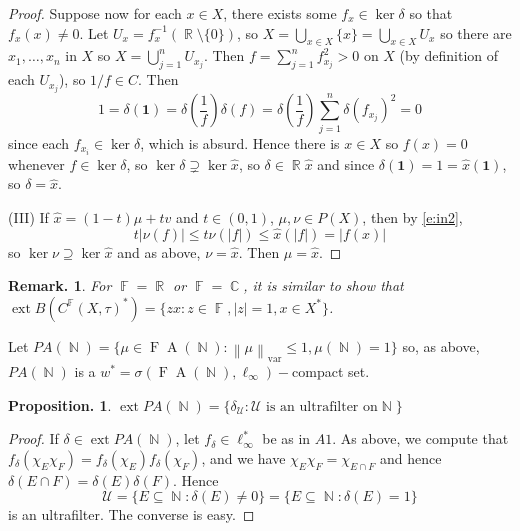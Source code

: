 \documentclass[11pt, a4paper]{memoir}
\DeclareMathOperator{\N}{{\mathbb{N}}}
\DeclareMathOperator{\R}{{\mathbb{R}}}
\DeclareMathOperator{\C}{{\mathbb{C}}}
\DeclareMathOperator{\F}{{\mathbb{F}}}
\newcommand{\norm}[1]{\ensuremath{\left\lVert#1\right\rVert}}
\theoremstyle{change}
\newtheorem{proposition}[theorem]{Proposition.}
\theoremstyle{plain}
\theoremstyle{nonumberplain}
\newtheorem{remark}{Remark.}
\newtheorem{proof}{Proof}
\DeclareMathOperator{\ext}{ext}
\newcommand{\idc}{\mathbf{1}}
\newcommand{\FA}{\ensuremath{\operatorname{F}\!\operatorname{A}}}
\numberwithin{equation}{section}
\begin{document}
\begin{proof}
    Suppose now for each $x\in X$, there exists some $f_x\in\ker\delta$ so that $f_x(x)\neq 0$.
    Let $U_x=f_x^{-1}(\R\setminus\{0\})$, so $X=\bigcup_{x\in X}\{x\}=\bigcup_{x\in X}U_x$ so there are $x_1,\ldots,x_n$ in $X$ so $X=\bigcup_{j=1}^n U_{x_j}$.
    Then $f=\sum_{j=1}^n f_{x_j}^2>0$ on $X$ (by definition of each $U_{x_j}$), so $1/f\in C$.
    Then
    \begin{equation*}
        1 = \delta(\idc)=\delta\left(\frac{1}{f}\right)\delta(f)=\delta\left(\frac{1}{f}\right)\sum_{j=1}^n\delta(f_{x_j})^2=0
    \end{equation*}
    since each $f_{x_i}\in\ker\delta$, which is absurd.
    Hence there is $x\in X$ so $f(x)=0$ whenever $f\in\ker\delta$, so $\ker\delta\supsetneq\ker\hat x$, so $\delta\in\R\hat x$ and since $\delta(\idc)=1=\hat x(\idc)$, so $\delta=\hat x$.

    (III) If $\hat x=(1-t)\mu+tv$ and $t\in(0,1)$, $\mu,\nu\in P(X)$, then by \cref{e:in2},
    \begin{equation*}
        t|\nu(f)|\leq t\nu(|f|)\leq\hat x(|f|)=|f(x)|
    \end{equation*}
    so $\ker\nu\supseteq\ker\hat x$ and as above, $\nu=\hat x$.
    Then $\mu=\hat x$.
\end{proof}
\begin{remark}
    For $\F=\R$ or $\F=\C$, it is similar to show that $\ext B(C^{\F}(X,\tau)^*)=\{z\hat x:z\in\F,|z|=1,x\in X^*\}$.
\end{remark}
Let $PA(\N)=\{\mu\in\FA(\N):\norm{\mu}_{\text{var}}\leq 1,\mu(\N)=1\}$ so, as above, $PA(\N)$ is a $w^*=\sigma(\FA(\N),\ell_\infty)-$compact set.
\begin{proposition}
    $\ext PA(\N)=\{\delta_{\mathcal{U}}:\mathcal{U}\text{ is an ultrafilter on}\N\}$
\end{proposition}
\begin{proof}
    If $\delta\in\ext PA(\N)$, let $f_\delta\in\ell_\infty^*$ be as in $A1$.
    As above, we compute that $f_\delta(\chi_E\chi_F)=f_\delta(\chi_E)f_\delta(\chi_F)$, and we have $\chi_E\chi_F=\chi_{E\cap F}$ and hence $\delta(E\cap F)=\delta(E)\delta(F)$.
    Hence
    \begin{equation*}
        \mathcal{U}=\{E\subseteq\N:\delta(E)\neq 0\}=\{E\subseteq\N:\delta(E)=1\}
    \end{equation*}
    is an ultrafilter.
    The converse is easy.
\end{proof}
\end{document}
